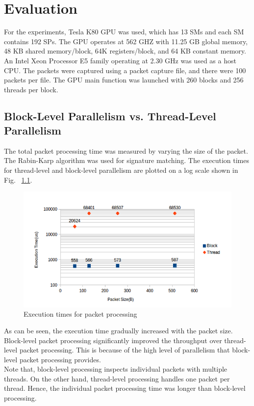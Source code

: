 \chapter{Evaluation}
For the experiments, Tesla K80 GPU was used, which has 13 SMs and each SM contains 192 SPs. The GPU operates at 562 GHZ with 11.25 GB global memory, 48 KB shared memory/block, 64K registers/block, and 64 KB constant memory. An Intel Xeon Processor E5 family operating at 2.30 GHz was used as a host CPU. The packets were captured using a packet capture file, and there were 100 packets per file. The GPU main function was launched with 260 blocks and 256 threads per block.

\section{Block-Level Parallelism vs. Thread-Level Parallelism}

The total packet processing time was measured by varying the size of the packet. The Rabin-Karp algorithm was used for signature matching. The execution times for thread-level and block-level parallelism are plotted on a log scale shown in Fig. ~\ref{fig:parallelism}. 

\begin{figure}[H]
	\centering
	\includegraphics[width=12cm]{parallelism.png}
	\caption{Execution times for packet processing}
	\label{fig:parallelism}
\end{figure}
\squeezeup

As can be seen, the execution time gradually increased with the packet size. Block-level packet processing significantly improved the throughput over thread-level packet processing. This is because of the high level of parallelism that block-level packet processing provides. \\
Note that, block-level processing inspects individual packets with multiple threads. On the other hand, thread-level processing handles one packet per thread. Hence, the individual packet processing time was longer than block-level processing.

